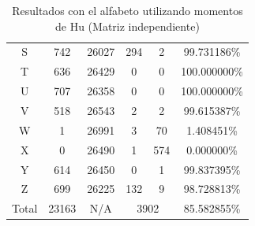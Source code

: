 \documentclass[a4paper, 11pt, oneside]{report}
\begin{document}
\begin{table}
\begin{tabular}{|c|c|c|c|c|c|}
	S & 742 & 26027 & 294 & 2 & 99.731186\% \\ 
	T & 636 & 26429 & 0 & 0 & 100.000000\% \\ 
	U & 707 & 26358 & 0 & 0 & 100.000000\% \\ 
	V & 518 & 26543 & 2 & 2 & 99.615387\% \\ 
	W & 1 & 26991 & 3 & 70 & 1.408451\% \\ 
	X & 0 & 26490 & 1 & 574 & 0.000000\% \\ 
	Y & 614 & 26450 & 0 & 1 & 99.837395\% \\ 
	Z & 699 & 26225 & 132 & 9 & 98.728813\% \\ 
	\hline
	Total & 23163 & N/A & \multicolumn{2}{|c|}{3902} & 85.582855\% \\
	\hline
\end{tabular}
\caption{Resultados con el alfabeto utilizando momentos de Hu (Matriz independiente)}
\label{tb:alphaHuIndep}
\end{table}
\end{document}
